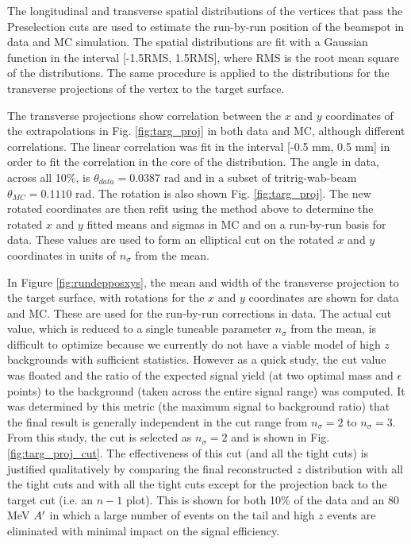 The longitudinal and transverse spatial distributions of the vertices that pass the Preselection cuts are used to estimate the run-by-run position of the beamspot in data and MC simulation. The spatial distributions are fit with a Gaussian function in the interval [-1.5RMS, 1.5RMS], where RMS is the root mean square of the distributions. The same procedure is applied to the distributions for the transverse projections of the vertex to the target surface. 

The transverse projections show correlation between the $x$ and $y$ coordinates of the extrapolations in Fig. \ref{fig:targ_proj} in both data and MC, although different correlations. The linear correlation was fit in the interval [-0.5 mm, 0.5 mm] in order to fit the correlation in the core of the distribution. The angle in data, across all 10\%, is $\theta_{data}=0.0387$ rad and in a subset of tritrig-wab-beam $\theta_{MC}=0.1110$ rad. The rotation is also shown Fig. \ref{fig:targ_proj}. The new rotated coordinates are then refit using the method above to determine the rotated $x$ and $y$ fitted means and sigmas in MC and on a run-by-run basis for data. These values are used to form an elliptical cut on the rotated $x$ and $y$ coordinates in units of $n_{\sigma}$ from the mean.


In Figure \ref{fig:rundepposxys}, the mean and width of the transverse projection to the target surface, with rotations for the $x$ and $y$ coordinates are shown for data and MC. These are used for the run-by-run corrections in data. The actual cut value, which is reduced to a single tuneable parameter $n_{\sigma}$ from the mean, is difficult to optimize because we currently do not have a viable model of high $z$ backgrounds with sufficient statistics. However as a quick study, the cut value was floated and the ratio of the expected signal yield (at two optimal mass and $\epsilon$ points) to the background (taken across the entire signal range) was computed. It was determined by this metric (the maximum signal to background ratio) that the final result is generally independent in the cut range from $n_{\sigma}=2$ to $n_{\sigma}=3$. From this study, the cut is selected as $n_{\sigma}=2$ and is shown in Fig. \ref{fig:targ_proj_cut}. The effectiveness of this cut (and all the tight cuts) is justified qualitatively by comparing the final reconstructed $z$ distribution with all the tight cuts and with all the tight cuts except for the projection back to the target cut (i.e. an $n-1$ plot). This is shown for both 10\% of the data and an 80 MeV $A^\prime$ in which a large number of events on the tail and high $z$ events are eliminated with minimal impact on the signal efficiency. %

